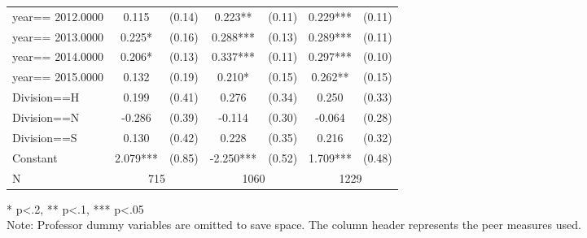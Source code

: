 \begin{sidewaystable}[htb]
\begin{threeparttable}
\begin{tabular}{l|c|c|c|c|c|c}
      year==  2012.0000 & 0.115                    & (0.14)                    & 0.223**   & (0.11) & 0.229***  & (0.11) \\
      year==  2013.0000 & 0.225*                   & (0.16)                    & 0.288***  & (0.13) & 0.289***  & (0.11) \\
      year==  2014.0000 & 0.206*                   & (0.13)                    & 0.337***  & (0.11) & 0.297***  & (0.10) \\
      year==  2015.0000 & 0.132                    & (0.19)                    & 0.210*    & (0.15) & 0.262**   & (0.15) \\
      Division==H       & 0.199                    & (0.41)                    & 0.276     & (0.34) & 0.250     & (0.33) \\
      Division==N       & -0.286                   & (0.39)                    & -0.114    & (0.30) & -0.064    & (0.28) \\
      Division==S       & 0.130                    & (0.42)                    & 0.228     & (0.35) & 0.216     & (0.32) \\
      Constant          & 2.079***                 & (0.85)                    & -2.250*** & (0.52) & 1.709***  & (0.48) \\
      \hline
      N                 & \multicolumn{2}{|c}{715} & \multicolumn{2}{|c}{1060} & \multicolumn{2}{|c}{1229}               \\
      \hline
      \hline
    \end{tabular}
    \begin{tablenotes}
    \item{* p<.2, ** p<.1, *** p<.05 \\ Note: Professor dummy variables are omitted to save space. The column header represents the peer measures used.}
    \end{tablenotes}
  \end{threeparttable}
\end{sidewaystable}

\clearpage{}

\newpage{}

